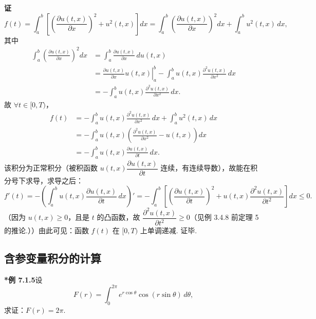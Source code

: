 \documentclass[UTF8,12pt,a4paper,fontset=fandol]{ctexart}
\begin{document}
\noindent\textbf{证}\quad
\[
f(t)=\int_a^b\left[\left(\frac{\partial u(t,x)}{\partial x}\right)^2+u^2(t,x)\right]dx
=\int_a^b\left(\frac{\partial u(t,x)}{\partial x}\right)^2dx+\int_a^b u^2(t,x)\,dx,
\]
其中
\[
\begin{aligned}
\int_a^b\left(\frac{\partial u(t,x)}{\partial x}\right)^2dx
&=\int_a^b\frac{\partial u(t,x)}{\partial x}\,du(t,x)\\
&=\left.\frac{\partial u(t,x)}{\partial x}u(t,x)\right|_a^b
-\int_a^b u(t,x)\frac{\partial^2u(t,x)}{\partial x^2}\,dx\\
&=-\int_a^b u(t,x)\frac{\partial^2u(t,x)}{\partial x^2}\,dx.
\end{aligned}
\]
故 $\forall t\in[0,T)$，
\[
\begin{aligned}
f(t)
&=-\int_a^b u(t,x)\frac{\partial^2u(t,x)}{\partial x^2}\,dx
+\int_a^b u^2(t,x)\,dx\\
&=-\int_a^b u(t,x)\left(\frac{\partial^2u(t,x)}{\partial x^2}-u(t,x)\right)dx\\
&=-\int_a^b u(t,x)\frac{\partial u(t,x)}{\partial t}\,dx.
\end{aligned}
\]
该积分为正常积分（被积函数 $u(t,x)\dfrac{\partial u(t,x)}{\partial t}$ 连续，有连续导数），故能在积分号下求导，求导之后：
\[
f'(t)=-\left(\int_a^b u(t,x)\frac{\partial u(t,x)}{\partial t}\,dx\right)'
=-\int_a^b\left[\left(\frac{\partial u(t,x)}{\partial t}\right)^2
+u(t,x)\frac{\partial^2u(t,x)}{\partial t^2}\right]dx\le0.
\]
（因为 $u(t,x)\ge0$，且是 $t$ 的凸函数，故 $\dfrac{\partial^2u(t,x)}{\partial t^2}\ge0$（见例 3.4.8 前定理 5 的推论.））由此可见：函数 $f(t)$ 在 $[0,T)$ 上单调递减. 证毕.

\subsection*{含参变量积分的计算}

\noindent\textbf{*例 7.1.5}\quad 设
\[
F(r)=\int_0^{2\pi}e^{r\cos\theta}\cos(r\sin\theta)\,d\theta,
\]
求证：$F(r)=2\pi$.
\end{document}

